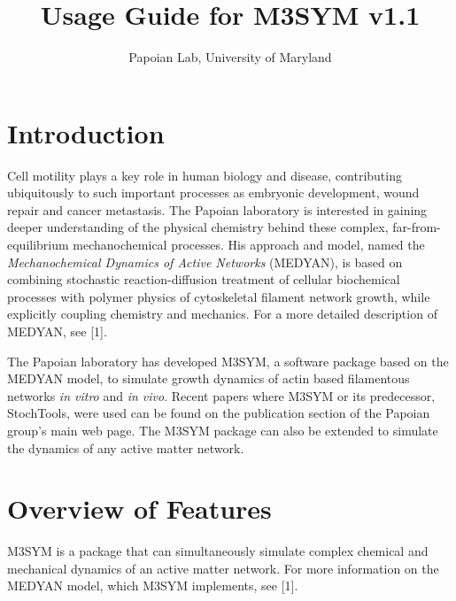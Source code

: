 \documentclass[11pt, oneside]{article}   	%
\title{Usage Guide for M3SYM v1.1}
\author{Papoian Lab, University of Maryland}
\date{}							%
\begin{document}
\maketitle



\tableofcontents

\newpage
\section {Introduction}

 Cell motility plays a key role in human biology and disease, contributing ubiquitously
 to such important processes as embryonic development, wound repair and cancer 
 metastasis. The Papoian laboratory is interested in gaining deeper understanding of the
 physical chemistry behind these complex, far-from-equilibrium mechanochemical 
 processes. His approach and model, named the \textit{Mechanochemical Dynamics of Active Networks} 
 (MEDYAN), is based on combining stochastic reaction-diffusion treatment
 of cellular biochemical processes with polymer physics of cytoskeletal filament network 
 growth, while explicitly coupling chemistry and mechanics. For a more detailed description of MEDYAN, see [1].
 
 The Papoian laboratory has developed M3SYM, a software package based on the MEDYAN
 model, to simulate growth dynamics of actin based filamentous networks \textit{in vitro} and 
 \textit{in vivo}. Recent papers where M3SYM or its predecessor, StochTools, were used 
 can be found on the publication section of the Papoian group's main web page. 
 The M3SYM package can also be extended to simulate the dynamics of any active matter network.


\section {Overview of Features}

M3SYM is a package that can simultaneously simulate complex chemical and mechanical dynamics
of an active matter network. For more information on the MEDYAN model, which M3SYM implements,
see [1].
\end{document}
